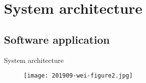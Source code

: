 

\section{System architecture}

\subsection{Software application}

\begin{frame}{System architecture}
	\begin{figure}[h]
        \centering
        \texttt{[image: 201909-wei-figure2.jpg]}
      \end{figure}
\end{frame}


